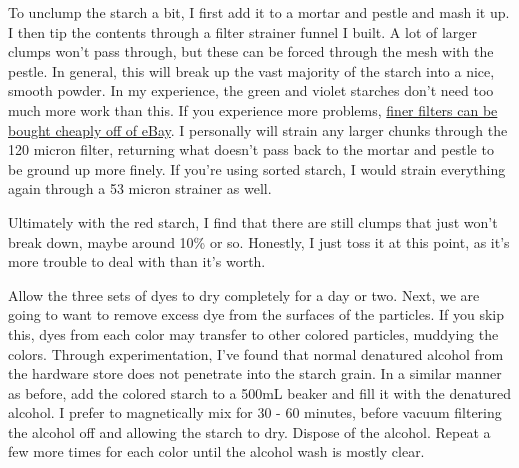 \documentclass[11pt]{article}
\begin{document}
To unclump the starch a bit, I first add it to a mortar and pestle and mash it up. I then tip the contents through a filter strainer funnel I built. A lot of larger clumps won't pass through, but these can be forced through the mesh with the pestle. In general, this will break up the vast majority of the starch into a nice, smooth powder. In my experience, the green and violet starches don't need too much more work than this. If you experience more problems, \href{https://www.ebay.com/i/192595777161?chn=ps&var=492727707679&norover=1&mkevt=1&mkrid=711-117182-37290-0&mkcid=2&itemid=492727707679_192595777161&targetid=595076263848&device=c&mktype=pla&googleloc=9017518&campaignid=6470474296&mkgroupid=76413868734&rlsatarget=aud-622524040958:pla-595076263848&abcId=1140476&merchantid=6296724&gclid=CjwKCAiA__HvBRACEiwAbViuU09ehml6cnzs9T5qfvSzJk5uni9c-r_RrP4ihTn8yZGbFzYJMfQEphoCJ8kQAvD_BwE}{finer filters can be bought cheaply off of eBay}. I personally will strain any larger chunks through the 120 micron filter, returning what doesn't pass back to the mortar and pestle to be ground up more finely. If you're using sorted starch, I would strain everything again through a 53 micron strainer as well.\newline

Ultimately with the red starch, I find that there are still clumps that just won't break down, maybe around 10\% or so. Honestly, I just toss it at this point, as it's more trouble to deal with than it's worth.\newline


Allow the three sets of dyes to dry completely for a day or two. Next, we are going to want to remove excess dye from the surfaces of the particles. If you skip this, dyes from each color may transfer to other colored particles, muddying the colors. Through experimentation, I've found that normal denatured alcohol from the hardware store does not penetrate into the starch grain. In a similar manner as before, add the colored starch to a 500mL beaker and fill it with the denatured alcohol. I prefer to magnetically mix for 30 - 60 minutes, before vacuum filtering the alcohol off and allowing the starch to dry. Dispose of the alcohol. Repeat a few more times for each color until the alcohol wash is mostly clear.\newline
\end{document}
